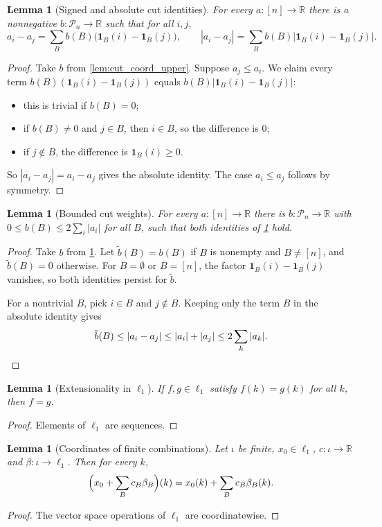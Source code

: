 \documentclass[11pt]{article}
\newtheorem{lemma}[theorem]{Lemma}
\theoremstyle{definition}
\theoremstyle{remark}
\newcommand{\one}{\mathbf{1}}
\newcommand{\R}{\mathbb{R}}
\newcommand{\Pn}{\mathcal{P}_n}
\begin{document}
\begin{lemma}[Signed and absolute cut identities]\label{lem:cut_coord_core}
For every $a:[n]\to\R$ there is a nonnegative $b:\Pn\to\R$ such that for all $i,j$,
\[
a_i-a_j=\sum_Bb(B)\bigl(\one_B(i)-\one_B(j)\bigr),\qquad |a_i-a_j|=\sum_Bb(B)\bigl|\one_B(i)-\one_B(j)\bigr| .
\]
\end{lemma}
\begin{proof}
Take $b$ from \cref{lem:cut_coord_upper}. Suppose $a_j\le a_i$. We claim every term $b(B)(\one_B(i)-\one_B(j))$ equals $b(B)|\one_B(i)-\one_B(j)|$:
\begin{itemize}
\item this is trivial if $b(B)=0$;
\item if $b(B)\ne0$ and $j\in B$, then $i\in B$, so the difference is $0$;
\item if $j\notin B$, the difference is $\one_B(i)\ge0$.
\end{itemize}
So $|a_i-a_j|=a_i-a_j$ gives the absolute identity. The case $a_i\le a_j$ follows by symmetry.
\end{proof}

\begin{lemma}[Bounded cut weights]\label{lem:cut_coord}
For every $a:[n]\to\R$ there is $b:\Pn\to\R$ with $0\le b(B)\le2\sum_i|a_i|$ for all $B$, such that both identities of \cref{lem:cut_coord_core} hold.
\end{lemma}
\begin{proof}
Take $b$ from \cref{lem:cut_coord_core}. Let $\tilde b(B)=b(B)$ if $B$ is nonempty and $B\ne[n]$, and $\tilde b(B)=0$ otherwise. For $B=\emptyset$ or $B=[n]$, the factor $\one_B(i)-\one_B(j)$ vanishes, so both identities persist for $\tilde b$.

For a nontrivial $B$, pick $i\in B$ and $j\notin B$. Keeping only the term $B$ in the absolute identity gives
\[
\tilde b(B)\le|a_i-a_j|\le|a_i|+|a_j|\le2\sum_k|a_k|. \qedhere
\]
\end{proof}

\begin{lemma}[Extensionality in $\ell_1$]\label{lem:cut_l1_ext}
If $f,g\in\ell_1$ satisfy $f(k)=g(k)$ for all $k$, then $f=g$.
\end{lemma}
\begin{proof}
Elements of $\ell_1$ are sequences.
\end{proof}

\begin{lemma}[Coordinates of finite combinations]\label{lem:cut_l1_apply}
Let $\iota$ be finite, $x_0\in\ell_1$, $c:\iota\to\R$ and $\beta:\iota\to\ell_1$. Then for every $k$,
\[
\Bigl(x_0+\sum_Bc_B\beta_B\Bigr)(k)=x_0(k)+\sum_Bc_B\beta_B(k).
\]
\end{lemma}
\begin{proof}
The vector space operations of $\ell_1$ are coordinatewise.
\end{proof}
\end{document}
